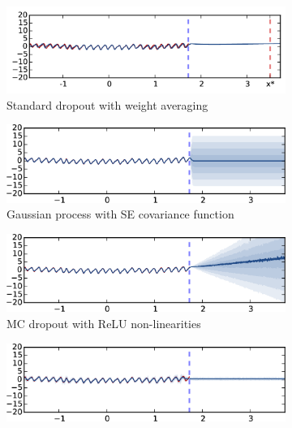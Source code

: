 \documentclass{article}
\theoremstyle{definition}
\begin{document}
\begin{figure}[t!]
\vspace{-2mm}
	\centering
	\begin{subfigure}[b]{0.5\textwidth}
		\includegraphics[width=\linewidth]{figs/exp1/co2_standard_dropout_relu.png}
		\vspace{-5mm}
		\caption{Standard dropout with weight averaging} \label{fig:extra_dropout}
	\end{subfigure}%
	\begin{subfigure}[b]{0.5\textwidth}
		\includegraphics[width=\linewidth]{figs/exp1/co2_GP_SE.png}
		\vspace{-5mm}
		\caption{Gaussian process with SE covariance function} \label{fig:extra_GP}
	\end{subfigure}
	\begin{subfigure}[b]{0.5\textwidth}
		\includegraphics[width=\linewidth]{figs/exp1/co2_MC_dropout_relu.png}
		\vspace{-5mm}
		\caption{MC dropout with ReLU non-linearities} \label{fig:extra_MC_RELU}
	\end{subfigure}%
	\begin{subfigure}[b]{0.5\textwidth}
		\includegraphics[width=\linewidth]{figs/exp1/co2_MC_dropout_01_tanh.png}

\end{subfigure}
\end{figure}
\end{document}
